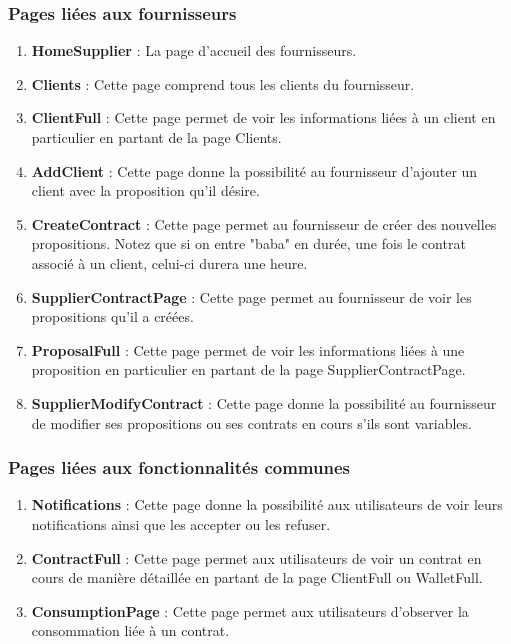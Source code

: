 \subsubsection{Pages liées aux fournisseurs}
\begin{enumerate}
\item \textbf{HomeSupplier} : \newline
La page d’accueil des fournisseurs.
\item \textbf{Clients} : \newline
Cette page comprend tous les clients du fournisseur.
\item \textbf{ClientFull} :  \newline
Cette page permet de voir les informations liées à un client en particulier en partant de la page Clients.
\item \textbf{AddClient} : \newline
Cette page donne la possibilité au fournisseur d’ajouter un client avec la proposition qu’il désire.
\item \textbf{CreateContract} :\newline
Cette page permet au fournisseur de créer des nouvelles propositions. \newline
Notez que si on entre "baba" en durée, une fois le contrat associé à un client, celui-ci durera une heure. 
\item \textbf{SupplierContractPage} :\newline
Cette page permet au fournisseur de voir les propositions qu’il a créées.
\item \textbf{ProposalFull} :\newline
Cette page permet de voir les informations liées à une proposition en particulier en partant de la page SupplierContractPage.
\item \textbf{SupplierModifyContract} :\newline
Cette page donne la possibilité au fournisseur de modifier ses propositions ou ses contrats en cours s’ils sont variables.
\end{enumerate} 

\subsubsection{Pages liées aux fonctionnalités communes}
\begin{enumerate}
\item \textbf{Notifications} :\newline
Cette page donne la possibilité aux utilisateurs de voir leurs notifications ainsi que les accepter ou les refuser.
\item \textbf{ContractFull} :\newline
Cette page permet aux utilisateurs de voir un contrat en cours de manière détaillée en partant de la page ClientFull ou WalletFull.
\item \textbf{ConsumptionPage} :\newline
Cette page permet aux utilisateurs d’observer la consommation liée à un contrat.
\end{enumerate}

